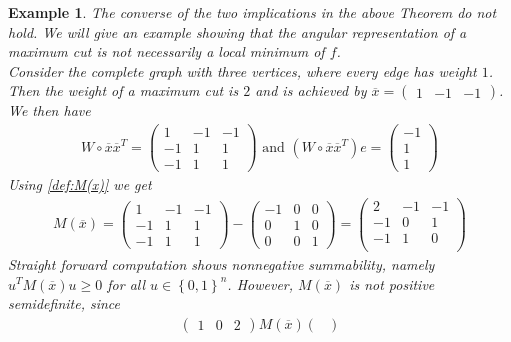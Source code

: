 \documentclass[12pt,a4paper]{article}
\theoremstyle{mythm}
\newtheorem*{exa}{Example}
\begin{document}
\begin{exa}
The converse of the two implications in the above Theorem do not hold. We will give an example showing that the angular representation of a maximum cut is not necessarily a
local minimum of $ f $. \\
Consider the complete graph with three vertices, where every edge has weight $ 1 $.
Then the weight of a maximum cut is $ 2 $ and is achieved by 
$ \overline{ x } = \begin{pmatrix}
1 & -1 & -1
\end{pmatrix}   $.
We then have 
\begin{align*}
W \circ \overline{ x } \overline{ x } ^T = \begin{pmatrix}
1 & -1 & -1 \\
-1 &1 & 1 \\
-1 & 1 & 1
\end{pmatrix} 
\text{ and } 
\left( W \circ \overline{ x } \overline{ x } ^T \right)  e = \begin{pmatrix}
-1 \\
1 \\
1
\end{pmatrix} 
\end{align*} 
Using \ref{def:M(x)} we get
\begin{align*}
M( \overline{ x } ) = 
\begin{pmatrix}
1 & -1 & -1 \\
-1 &1 & 1 \\
-1 & 1 & 1
\end{pmatrix} 
- 
\begin{pmatrix}
-1 & 0 & 0 \\
0 & 1 & 0 \\
0 & 0 & 1
\end{pmatrix} 
= \begin{pmatrix}
2 & -1 & -1 \\
-1 & 0 & 1 \\
-1 & 1 & 0 \\
\end{pmatrix} 
\end{align*} 
Straight forward computation shows nonnegative summability, namely $ u ^T M ( \overline{ x } ) u \geq 0  $ for all $ u \in \left\{ 0,1 \right\} ^{ n }  $.
However, $ M ( \overline{ x } )  $ is not positive semidefinite, since
\begin{align*}
\begin{pmatrix}
1 & 0 & 2
\end{pmatrix} 
M ( \overline{ x } ) 
\begin{pmatrix}

\end{pmatrix}
\end{align*}
\end{exa}
\end{document}
